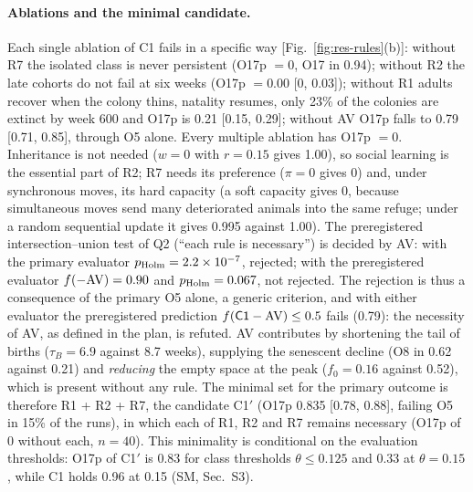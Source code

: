 \paragraph{Ablations and the minimal candidate.}
Each single ablation of \textsf{C1} fails in a specific way [Fig.~\ref{fig:res-rules}(b)]: without R7 the
isolated class is never persistent (O17p $=0$, O17 in 0.94); without R2 the late cohorts do not fail at six weeks
(O17p $=0.00$ [0, 0.03]); without R1 adults recover when the colony thins, natality resumes, only 23\% of the
colonies are extinct by week 600 and O17p is 0.21 [0.15, 0.29]; without AV O17p falls to 0.79 [0.71, 0.85],
through O5 alone. Every multiple ablation has O17p $=0$. Inheritance is not needed ($w=0$ with $r=0.15$ gives
1.00), so social learning is the essential part of R2; R7 needs its preference ($\pi=0$ gives 0) and, under
synchronous moves, its hard capacity (a soft capacity gives 0, because simultaneous moves send many deteriorated
animals into the same refuge; under a random sequential update it gives 0.995 against 1.00). The preregistered
intersection--union test of Q2 (``each rule is necessary'') is decided by AV: with the primary evaluator
$p_{\rm Holm}=2.2\times10^{-7}$, rejected; with the preregistered evaluator $f(-{\rm AV})=0.90$ and
$p_{\rm Holm}=0.067$, not rejected. The rejection is thus a consequence of the primary O5 alone, a generic
criterion, and with either evaluator the preregistered prediction $f(\textsf{C1}-{\rm AV})\le0.5$ fails (0.79): the
necessity of AV, as defined in the plan, is refuted. AV contributes by shortening the tail of births ($\tau_B=6.9$
against 8.7 weeks), supplying the senescent decline (O8 in 0.62 against 0.21) and \emph{reducing} the empty space
at the peak ($f_0=0.16$ against 0.52), which is present without any rule. The minimal set for the primary outcome
is therefore R1 + R2 + R7, the candidate \textsf{C1}$'$ (O17p 0.835 [0.78, 0.88], failing O5 in 15\% of the runs),
in which each of R1, R2 and R7 remains necessary (O17p of 0 without each, $n=40$). This minimality is conditional
on the evaluation thresholds: O17p of \textsf{C1}$'$ is 0.83 for class thresholds $\theta\le0.125$ and 0.33 at
$\theta=0.15$, while \textsf{C1} holds 0.96 at 0.15 (SM, Sec.~S3).

